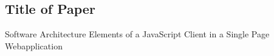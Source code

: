 



\usepackage[utf8]{inputenc} %




%


\newcommand{\vorname}{Anastasia}
\newcommand{\nachname}{Stieb}
\newcommand{\matrikelnummer}{Matrikel-Nr. 2023959}

\newcommand{\titel}{Software Architektur Elemente des JavaScript Clients in einer Single Page Webapplikation \\[0.2ex]
				\Large am Beispiel einer Fotoverwaltungssoftware}

\newcommand{\erstpruef}{Prof. Dr. Andreas Plaß}
\newcommand{\zweitpruef}{Prof. Dr. Torsten Edeler}

\date{\sffamily Hamburg, 15. 7. 2021}  %



\maketitle           %
\newpage


\thispagestyle{empty}
\subsection*{Title of Paper}
Software Architecture Elements of a JavaScript Client in a Single Page Webapplication

